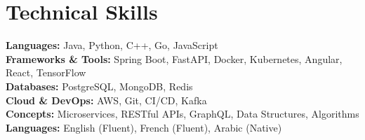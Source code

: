 \documentclass[letterpaper,11pt]{article}
\begin{document}
\section{Technical Skills}
\begin{itemize}[leftmargin=0.15in, label={}]
\small{\item{
\textbf{Languages:} Java, Python, C++, Go, JavaScript \\
\textbf{Frameworks \& Tools:} Spring Boot, FastAPI, Docker, Kubernetes, Angular, React, TensorFlow \\
\textbf{Databases:} PostgreSQL, MongoDB, Redis \\
\textbf{Cloud \& DevOps:} AWS, Git, CI/CD, Kafka \\
\textbf{Concepts:} Microservices, RESTful APIs, GraphQL, Data Structures, Algorithms \\
\textbf{Languages:} English (Fluent), French (Fluent), Arabic (Native)
}}
\end{itemize}
\end{document}

